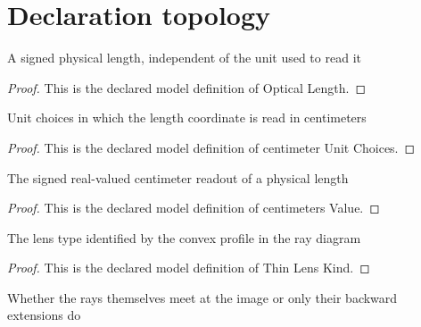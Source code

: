 \section{Declaration topology}
\begin{definition}
  \label{def:physics:phyx-mini-0052:phyxminiproblems-problemphyxmini0052-opticallength}
  A signed physical length, independent of the unit used to read it
\end{definition}
\begin{proof}
  This is the declared model definition of Optical Length.
\end{proof}
\begin{definition}
  \label{def:physics:phyx-mini-0052:phyxminiproblems-problemphyxmini0052-centimeterunitchoices}
  Unit choices in which the length coordinate is read in centimeters
\end{definition}
\begin{proof}
  This is the declared model definition of centimeter Unit Choices.
\end{proof}
\begin{definition}
  \label{def:physics:phyx-mini-0052:phyxminiproblems-problemphyxmini0052-centimetersvalue}
  The signed real-valued centimeter readout of a physical length
\end{definition}
\begin{proof}
  This is the declared model definition of centimeters Value.
\end{proof}
\begin{definition}
  \label{def:physics:phyx-mini-0052:phyxminiproblems-problemphyxmini0052-thinlenskind}
  The lens type identified by the convex profile in the ray diagram
\end{definition}
\begin{proof}
  This is the declared model definition of Thin Lens Kind.
\end{proof}
\begin{definition}
  \label{def:physics:phyx-mini-0052:phyxminiproblems-problemphyxmini0052-imagenature}
  Whether the rays themselves meet at the image or only their backward extensions do
\end{definition}
